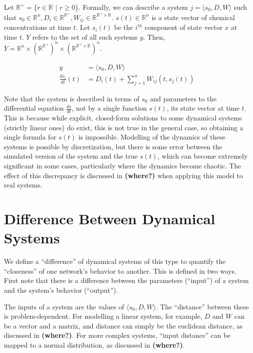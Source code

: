 \documentclass{article}
\begin{document}
Let $\mathbb{R}^+ = \{r \in \mathbb{R} \,\,|\,\, r \ge 0\}$. Formally, we can describe a system $j = \langle s_0, D, W \rangle$ such that $s_0 \in \mathbb{R}^n, D_i \in \mathbb{R}^{\mathbb{R}^+}, W_{ij} \in \mathbb{R}^{\mathbb{R}^+ \times \mathbb{R}}$. $s(t) \in \mathbb{R}^n$ is a state vector of chemical concentrations at time $t$. Let $s_i(t)$ be the $i^{th}$ component of state vector $x$ at time $t$. $Y$ refers to the set of all such systems $y$. Then, $Y = \mathbb{R}^n \times (\mathbb{R}^{\mathbb{R}^+})^n \times (\mathbb{R}^{\mathbb{R}^+ \times \mathbb{R}})^n$.

\begin{align}
  y &= \langle s_0, D, W \rangle \label{system-defn} \\
  \frac{ds_i}{dt}(t) &= D_i(t) + \sum_{j = 1}^n W_{ij}(t, s_j(t)) \label{system-diffeq}
\end{align}

Note that the system is described in terms of $s_0$ and parameters to the differential equation $\frac{ds}{dt}$, not by a single function $s(t)$, its state vector at time $t$. This is because while explicit, closed-form solutions to some dynamical systems (strictly linear ones) do exist, this is not true in the general case, so obtaining a single formula for $s(t)$ is impossible. Modelling of the dynamics of these systems is possible by discretization, but there is some error between the simulated version of the system and the true $s(t)$, which can become extremely significant in some cases, particularly where the dynamics become chaotic. The effect of this discrepancy is discussed in \textbf{(where?)} when applying this model to real systems.

\section{Difference Between Dynamical Systems} \label{similarity}
We define a ``difference'' of dynamical systems of this type to quantify the ``closeness'' of one network's behavior to another. This is defined in two ways. First note that there is a difference between the parameters (``input'') of a system and the system's behavior (``output'').

The inputs of a system are the values of $\langle s_0, D, W \rangle$. The ``distance'' between these is problem-dependent. For modelling a linear system, for example, $D$ and $W$ can be a vector and a matrix, and distance can simply be the euclidean distance, as discussed in \textbf{(where?)}. For more complex systems, ``input distance'' can be mapped to a normal distribution, as discussed in \textbf{(where?)}.
\end{document}
